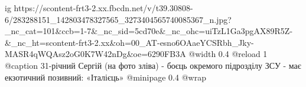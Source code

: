  
 
 
 
 

\ifcmt
  ig https://scontent-frt3-2.xx.fbcdn.net/v/t39.30808-6/283288151_142803478327565_3273404565740085367_n.jpg?_nc_cat=101&ccb=1-7&_nc_sid=5cd70e&_nc_ohc=uiTzL1Ga3pgAX89R5Z-&_nc_ht=scontent-frt3-2.xx&oh=00_AT-esno6OAaeYCSRbh_Jky-MASR4qWQAsz2oG0K7W42nDg&oe=6290FB3A
  @width 0.4
	@reload 1
  @caption 31-річний Сергій (на фото зліва) - боєць окремого підрозділу ЗСУ - має екзотичний позивний: «Італієць»
  @minipage 0.4
  @wrap \parpic[r]
\fi
